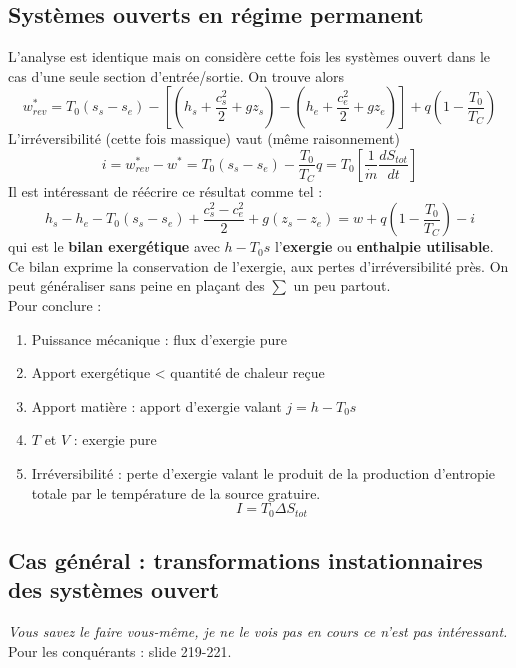 		\subsection{Systèmes ouverts en régime permanent}
		L'analyse est identique mais on considère cette fois les systèmes ouvert 
		dans le cas d'une seule section d'entrée/sortie. On trouve alors
		\begin{equation}
		w_{rev}^* = T_0(s_s-s_e) - \left[\left(h_s+\dfrac{c_s^2}{2}+gz_s\right)-
		\left(h_e+\dfrac{c_e^2}{2}+gz_e\right)\right] + q\left(1-\dfrac{T_0}{T_C}\right)
		\label{eq:TravIrr}
		\end{equation}
		L'irréversibilité (cette fois massique) vaut (même raisonnement) 
		\begin{equation}
		i = w_{rev}^* - w^* = T_0(s_s-s_e) - \dfrac{T_0}{T_C}q = T_0\left[\dfrac{1}{
		\dot{m}}\dfrac{dS_{tot}}{dt}\right]
		\end{equation}
		Il est intéressant de réécrire ce résultat comme tel :
		\begin{equation}
		h_s-h_e - T_0(s_s-s_e) + \dfrac{c_s^2-c_e^2}{2}+g(z_s-z_e) = w + q\left(
		1-\dfrac{T_0}{T_C}\right) - i
		\end{equation}
		qui est le \textbf{bilan exergétique} avec $h-T_0s$ l'\textbf{exergie} ou 
		\textbf{enthalpie utilisable}. Ce bilan exprime la conservation de l'exergie, 
		aux pertes d'irréversibilité près. On peut généraliser sans peine en plaçant 
		des $\sum$ un peu partout.\\
		Pour conclure :
		\begin{enumerate}
		\item Puissance mécanique : flux d'exergie pure
		\item Apport exergétique < quantité de chaleur reçue
		\item Apport matière : apport d'exergie valant $j = h-T_0s$
		\item $T$ et $V$ : exergie pure
		\item Irréversibilité : perte d'exergie valant le produit de la production 
		d'entropie totale par le température de la source gratuire.
		\begin{equation}
		I = T_0\Delta S_{tot}
		\end{equation}
		\end{enumerate}
		
		\subsection{Cas général : transformations instationnaires des systèmes ouvert}
		\textit{Vous savez le faire vous-même, je ne le vois pas en cours ce n'est 
		pas intéressant.} Pour les conquérants : slide 219-221.
		
